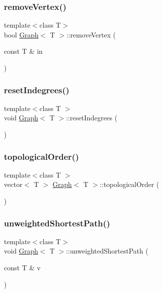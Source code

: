 \subsubsection{\texorpdfstring{remove\+Vertex()}{removeVertex()}}
{\footnotesize\ttfamily template$<$class T$>$ \\
bool \hyperlink{class_graph}{Graph}$<$ T $>$\+::remove\+Vertex (\begin{DoxyParamCaption}\item[{const T \&}]{in }\end{DoxyParamCaption})}

\mbox{\label{class_graph_af34eb86d804272e6e3e221a9ed688c53}} 
\subsubsection{\texorpdfstring{reset\+Indegrees()}{resetIndegrees()}}
{\footnotesize\ttfamily template$<$class T $>$ \\
void \hyperlink{class_graph}{Graph}$<$ T $>$\+::reset\+Indegrees (\begin{DoxyParamCaption}{ }\end{DoxyParamCaption})}

\mbox{\label{class_graph_a2e75512c089c3916dda9cf61e1185d9d}} 
\subsubsection{\texorpdfstring{topological\+Order()}{topologicalOrder()}}
{\footnotesize\ttfamily template$<$class T $>$ \\
vector$<$ T $>$ \hyperlink{class_graph}{Graph}$<$ T $>$\+::topological\+Order (\begin{DoxyParamCaption}{ }\end{DoxyParamCaption})}

\mbox{\label{class_graph_ae5264597aacaf4f45819e96a6d6c89aa}} 
\subsubsection{\texorpdfstring{unweighted\+Shortest\+Path()}{unweightedShortestPath()}}
{\footnotesize\ttfamily template$<$class T$>$ \\
void \hyperlink{class_graph}{Graph}$<$ T $>$\+::unweighted\+Shortest\+Path (\begin{DoxyParamCaption}\item[{const T \&}]{v }\end{DoxyParamCaption})}



